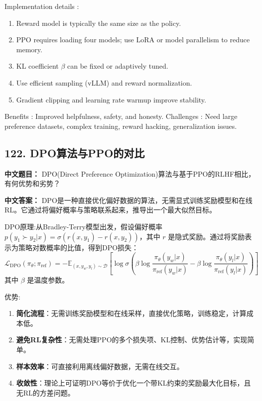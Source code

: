 \documentclass[10pt,a4paper]{ctexart}
\begin{document}
 Implementation details :
\begin{enumerate}
    \item Reward model is typically the same size as the policy.
    \item PPO requires loading four models; use LoRA or model parallelism to reduce memory.
    \item KL coefficient \(\beta\) can be fixed or adaptively tuned.
    \item Use efficient sampling (vLLM) and reward normalization.
    \item Gradient clipping and learning rate warmup improve stability.
\end{enumerate}

 Benefits : Improved helpfulness, safety, and honesty.
 Challenges : Need large preference datasets, complex training, reward hacking, generalization issues.

\subsection*{122. DPO算法与PPO的对比}
\textbf{中文题目：} DPO(Direct Preference Optimization)算法与基于PPO的RLHF相比，有何优势和劣势？

\textbf{中文答案：}  
DPO是一种直接优化偏好数据的算法，无需显式训练奖励模型和在线RL。它通过将偏好概率与策略联系起来，推导出一个最大似然目标。

 DPO原理:从Bradley-Terry模型出发，假设偏好概率 \(p(y_1 \succ y_2 | x) = \sigma(r(x, y_1) - r(x, y_2))\)，其中 \(r\) 是隐式奖励。通过将奖励表示为策略对数概率的比值，得到DPO损失：
\[
\mathcal{L}_{\text{DPO}}(\pi_\theta; \pi_{\text{ref}}) = -\mathbb{E}_{(x, y_w, y_l) \sim \mathcal{D}} \left[ \log \sigma \left( \beta \log \frac{\pi_\theta(y_w|x)}{\pi_{\text{ref}}(y_w|x)} - \beta \log \frac{\pi_\theta(y_l|x)}{\pi_{\text{ref}}(y_l|x)} \right) \right]
\]
其中 \(\beta\) 是温度参数。

 优势:
\begin{enumerate}
    \item \textbf{简化流程}：无需训练奖励模型和在线采样，直接优化策略，训练稳定，计算成本低。
    \item \textbf{避免RL复杂性}：无需处理PPO的多个损失项、KL控制、优势估计等，实现简单。
    \item \textbf{样本效率}：可直接利用离线偏好数据，无需在线交互。
    \item \textbf{收敛性}：理论上可证明DPO等价于优化一个带KL约束的奖励最大化目标，且无RL的方差问题。
\end{enumerate}
\end{document}
